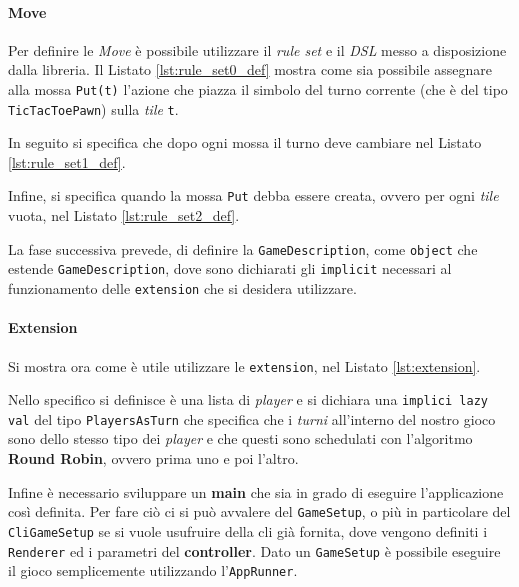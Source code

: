 \paragraph{Move}
Per definire le \textit{Move} è possibile utilizzare il \textit{rule set} e il \textit{DSL} messo a disposizione dalla libreria.
%
Il Listato \ref{lst:rule_set0_def} mostra come sia possibile assegnare alla mossa \texttt{Put(t)} l'azione che piazza il simbolo del turno corrente (che è del tipo \texttt{TicTacToePawn}) sulla \textit{tile} \texttt{t}.
%

%
In seguito si specifica che dopo ogni mossa il turno deve cambiare nel Listato \ref{lst:rule_set1_def}.

%
Infine, si specifica quando la mossa \texttt{Put} debba essere creata, ovvero per ogni \textit{tile} vuota, nel Listato \ref{lst:rule_set2_def}.
%


La fase successiva prevede, di definire la \texttt{GameDescription}, come \texttt{object} che estende \texttt{GameDescription}, dove sono dichiarati gli \texttt{implicit} necessari al funzionamento delle \texttt{extension} che si desidera utilizzare.

\paragraph{Extension}
%
Si mostra ora come è utile utilizzare le \texttt{extension}, nel Listato \ref{lst:extension}.
%

%
Nello specifico si definisce è una lista di \textit{player} e si dichiara una \texttt{implici lazy val} del tipo \texttt{PlayersAsTurn} che specifica che i \textit{turni} all'interno del nostro gioco sono dello stesso tipo dei \textit{player} e che questi sono schedulati con l'algoritmo \textbf{Round Robin}, ovvero prima uno e poi l'altro.

Infine è necessario sviluppare un \textbf{main} che sia in grado di eseguire l'applicazione così definita.
%
Per fare ciò ci si può avvalere del \texttt{GameSetup}, o più in particolare del \texttt{CliGameSetup} se si vuole usufruire della cli già fornita, dove vengono definiti i \texttt{Renderer} ed i parametri del \textbf{controller}.
%
Dato un \texttt{GameSetup} è possibile eseguire il gioco semplicemente utilizzando l'\texttt{AppRunner}.
